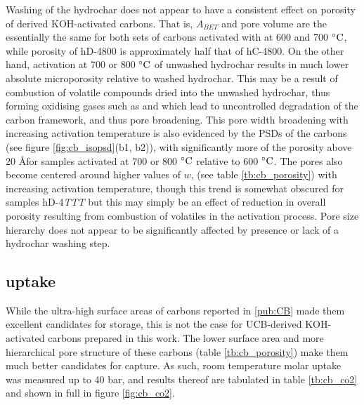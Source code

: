 Washing of the hydrochar does not appear to have a consistent effect on porosity of derived KOH-activated carbons. That is,  $A_{BET}$ and pore volume are the essentially the same for both sets of carbons activated with  at 600 and 700 $\rm ^{\circ}C$, while porosity of hD-4800 is approximately half that of hC-4800. On the other hand, activation at 700 or 800 $\rm ^{\circ}C$ of unwashed hydrochar results in much lower absolute microporosity relative to washed hydrochar. This may be a result of combustion of volatile compounds dried into the unwashed hydrochar, thus forming oxidising gases such as  and  which lead to uncontrolled degradation of the carbon framework, and thus pore broadening.\citep{Sevilla2014Energy, Blankenship2022Modulating} This pore width broadening with increasing activation temperature is also evidenced by the PSDs of the carbons (see figure \ref{fig:cb_isopsd}(b1, b2)), with significantly more of the porosity above 20 \AA\space for samples activated at 700 or 800 $\rm ^{\circ}C$ relative to 600 $\rm ^{\circ}C$. The pores also become centered around higher values of $w$, (see table \ref{tb:cb_porosity}) with increasing activation temperature, though this trend is somewhat obscured for samples hD-4\textit{TTT} but this may simply be an effect of reduction in overall porosity resulting from combustion of volatiles in the activation process. Pore size hierarchy does not appear to be significantly affected by presence or lack of a hydrochar washing step.

\subsection{\texorpdfstring{ uptake}{CO2 uptake}}

While the ultra-high surface areas of carbons reported in \ref{pub:CB} made them excellent candidates for  storage, this is not the case for UCB-derived KOH-activated carbons prepared in this work. The lower surface area and more hierarchical pore structure of these carbons (table \ref{tb:cb_porosity}) make them much better candidates for  capture. As such, room temperature molar  uptake was measured up to 40 bar, and results thereof are tabulated in table \ref{tb:cb_co2} and shown in full in figure \ref{fig:cb_co2}. 

